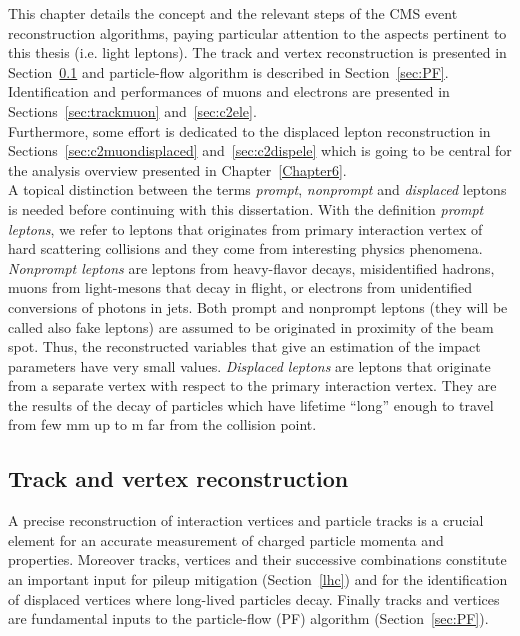 \vspace{0.7cm}


This chapter details the concept and the relevant steps of the CMS
event reconstruction algorithms, paying particular attention to the
aspects pertinent to this thesis (i.e. light leptons). The track and vertex reconstruction 
is presented in Section~\ref{sec:trackvertex} and particle-flow
algorithm is described in Section~\ref{sec:PF}. Identification and
performances of muons and electrons are presented in
Sections~\ref{sec:trackmuon} and~\ref{sec:c2ele}.\\
Furthermore, some
effort is dedicated to the displaced lepton reconstruction in
Sections~\ref{sec:c2muondisplaced} and~\ref{sec:c2dispele} which is going to be central for the
analysis overview presented in Chapter~\ref{Chapter6}.\\

A topical distinction between the terms \emph{prompt}, \emph{nonprompt} and
\emph{displaced} leptons is needed before continuing with this
dissertation. With the definition \emph{prompt leptons}, we refer to
leptons that originates from primary
interaction vertex of hard scattering collisions and they come from
interesting physics phenomena. \emph{Nonprompt leptons} are leptons from heavy-flavor decays, misidentified hadrons, muons from
light-mesons that decay in flight, or electrons from unidentified
conversions of  photons in jets. Both prompt and nonprompt leptons
(they will be called also fake leptons) are assumed to be originated
in proximity of  the beam
spot. Thus, the reconstructed variables that give an estimation of the
impact parameters have very small values. \emph{Displaced leptons} are
leptons that originate from a separate vertex with respect to
the primary interaction vertex. They are the results of the decay of 
particles which have lifetime ``long'' enough to travel from few mm up
to m far from the collision point.

\subsection{Track and vertex reconstruction}\label{sec:trackvertex}

A precise reconstruction of interaction vertices and 
particle tracks is a crucial element for an accurate measurement of
charged particle momenta and properties. Moreover tracks, vertices and their
successive combinations constitute an important input for pileup
mitigation (Section~\ref{lhc}) and for the
identification of displaced vertices where long-lived particles decay.
Finally tracks and vertices are fundamental inputs to the
particle-flow (PF) algorithm (Section~\ref{sec:PF}). \\

